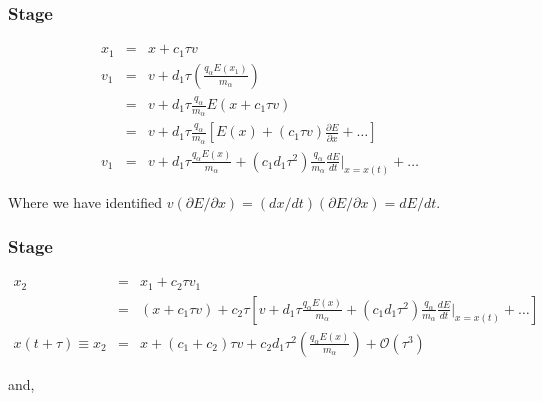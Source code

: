 \documentclass[11pt,titlepage]{report}
\begin{document}
\subsubsection{Stage }

\begin{eqnarray*}
x_1 & = & x +  c_1\tau v  \\[0.3em]
v_1 & = & v + d_1\tau \left(\frac{q_{\alpha}E(x_1)}{m_{\alpha}}\right)  \\[0.3em]
& = & v + d_1\tau \frac{q_{\alpha}}{m_{\alpha}}E(x + c_1\tau v) \\[0.3em]
& = & v + d_1\tau \frac{q_{\alpha}}{m_{\alpha}}\left[E(x) + (c_1\tau v)\frac{\partial E}{\partial x} + \ldots \right] \\[0.3em]
v_1 & = & v + d_1\tau \frac{q_{\alpha}E(x)}{m_{\alpha}} + (c_1d_1\tau^2 )\frac{q_{\alpha}}{m_{\alpha}}\frac{dE}{dt}\biggr|_{x = x(t)} + \ldots
\end{eqnarray*}

\noindent Where we have identified $v (\partial E / \partial x) = (dx/dt)(\partial E / \partial x) = dE/dt$.

\subsubsection{Stage }

\begin{eqnarray}
x_2 & = & x_1 +  c_2\tau v_1 \nonumber \\[0.3em]
& = & (x +  c_1\tau v) + c_2\tau \left[v + d_1\tau \frac{q_{\alpha}E(x)}{m_{\alpha}} + (c_1d_1\tau^2 )\frac{q_{\alpha}}{m_{\alpha}}\frac{dE}{dt}\biggr|_{x = x(t)} + \ldots\right]  \nonumber\\[0.3em]
x(t+\tau ) \equiv x_2 & = & x +  (c_1 + c_2)\tau v + c_2 d_1 \tau^2 \left(\frac{q_{\alpha}E(x)}{m_{\alpha}}\right) + \mathcal{O}(\tau^3) \label{eq:Strang_order_conditions_x}
\end{eqnarray}

\noindent and,
\end{document}

